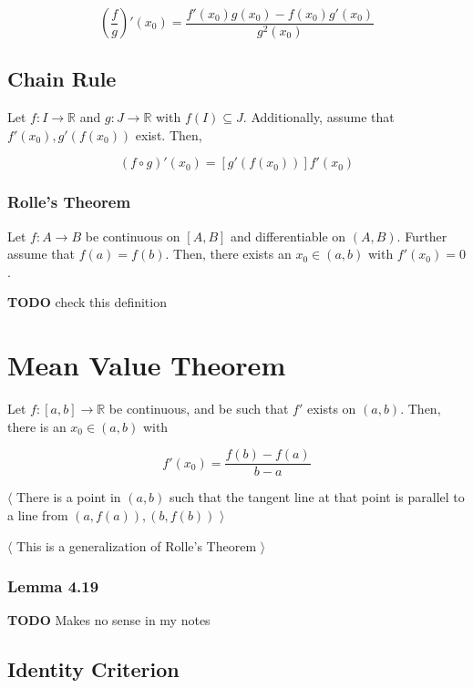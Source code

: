 \documentclass[12pt,letterpaper]{article}
\newcommand{\R}{{\mathbb R}}
\newcommand{\btw}[1]{
    $\langle$ #1 $\rangle$
}
\newcommand{\TODO}{\color{red}\textbf{TODO}\color{black}}
\begin{document}
\begin{multicols*}{2}
        \[
          \left(\frac{f}{g}\right)'(x_0) = \frac{f'(x_0)g(x_0) - f(x_0)g'(x_0)}{g^2(x_0)}
        \]

        \subsection{Chain Rule}

        Let $f: I \rightarrow \R$ and $g: J \rightarrow \R$ with $f(I) \subseteq
        J$. Additionally, assume that $f'(x_0), g'(f(x_0))$ exist. Then,

        \[
          (f \circ g)'(x_0) = [g'(f(x_0))]f'(x_0)
        \]

        \subsubsection{Rolle's Theorem}

        Let $f: A \rightarrow B$ be continuous on $[A, B]$ and differentiable on
        $(A, B)$. Further assume that $f(a) = f(b)$. Then, there exists an $x_0
        \in (a, b)$ with $f'(x_0) = 0$.

        \TODO{} check this definition

        \section{Mean Value Theorem}

        Let $f: [a, b] \rightarrow \R$ be continuous, and be such that $f'$
        exists on $(a, b)$. Then, there is an $x_0 \in (a, b)$ with 

        \[
          f'(x_0) = \frac{f(b) - f(a)}{b - a}
        \]

        \btw {There is a point in $(a, b)$ such that the tangent line at that
        point is parallel to a line from $(a, f(a)), (b, f(b))$}

        \btw {This is a generalization of Rolle's Theorem}

        \subsubsection{Lemma 4.19}

        \TODO{} Makes no sense in my notes

        \subsection{Identity Criterion}


\end{multicols*}
\end{document}
